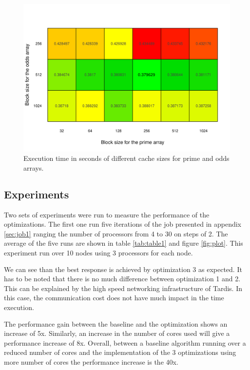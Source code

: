 \documentclass[10pt]{scrartcl}
\begin{document}
\begin{figure}
  \centering
  \includegraphics[width=\textwidth]{cache}
  \caption{Execution time in seconds of different cache sizes for prime and odds arrays.}\label{fig:cache}
\end{figure}

\subsection{Experiments}
Two sets of experiments were run to measure the performance of the optimizations.  The first one run five iterations of the job presented in appendix \ref{sec:job1} ranging the number of processors from 4 to 30 on steps of 2.  The average of the five runs are shown in table \ref{tab:table1} and figure \ref{fig:plot}.  This experiment run over 10 nodes using 3 processors for each node.

We can see than the best response is achieved by optimization 3 as expected.  It has to be noted that there is no much difference between optimization 1 and 2.  This can be explained by the high speed networking infrastructure of Tardis.  In this case, the communication cost does not have much impact in the time execution.

The performance gain between the baseline and the optimization shows an increase of 5x.  Similarly, an increase in the number of cores used will give a performance increase of 8x.  Overall, between a baseline algorithm running over a reduced number of cores and the implementation of the 3 optimizations using more number of cores the performance increase is the 40x.
\end{document}
